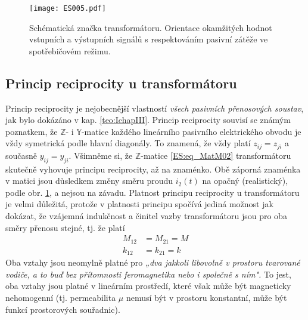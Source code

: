       \begin{figure}[ht!] %
        \centering
        \texttt{[image: ES005.pdf]}
        \caption{Schématická značka transformátoru. Orientace okamžitých hodnot vstupních a  
                 výstupních signálů s respektováním pasivní zátěže ve spotřebičovém režimu.}
        \label{ES:fig_005}
      \end{figure}

    \subsection{Princip reciprocity u transformátoru}
      Princip reciprocity je nejobecnější vlastností \emph{všech pasivních přenosových soustav}, 
      jak bylo dokázáno v kap. \ref{teo:IchapIII}. Princip reciprocity souvisí se známým 
      poznatkem, že \(\mathbb{Z}\)- i \(\mathbb{Y}\)-matice každého lineárního pasivního 
      elektrického obvodu je vždy symetrická podle hlavní diagonály. To znamená, že vždy platí 
      \(z_{ij} = z_{ji}\) a současně \(y_{ij} = y_{ji}\). Všimněme si, že \(\mathbb{Z}\)-matice 
      \ref{ES:eq_MatM02} transformátoru skutečně vyhovuje principu reciprocity, až na znaménko. Obě 
      záporná znaménka v matici jsou důsledkem změny směru proudu \(i_2(t)\) na opačný 
      (realistický), podle obr. \ref{ES:fig_005}, a nejsou na závadu. Platnost principu reciprocity 
      u transformátoru je velmi důležitá, protože v platnosti principu spočívá jediná možnost jak 
      dokázat, že vzájemná indukčnost a činitel vazby transformátoru jsou pro oba směry 
      přenosu stejné, tj. že platí
      \begin{subequations}
        \begin{align}
          M_{12} &= M_{21} = M  \label{teo:eq000a}\\
          k_{12} &= k_{21} = k  \label{teo:eq000b}
        \end{align}
      \end{subequations}
      Oba vztahy jsou neomylně platné pro \emph{„dva jakkoli libovolně v prostoru tvarované vodiče, 
      a to buď bez přítomnosti feromagnetika nebo i společně s ním".} To jest, oba vztahy jsou 
      platné v lineárním prostředí, které však může být magneticky nehomogenní (tj. permeabilita 
      \(\mu\) nemusí být v prostoru konstantní, může být funkcí prostorových souřadnic).
    
